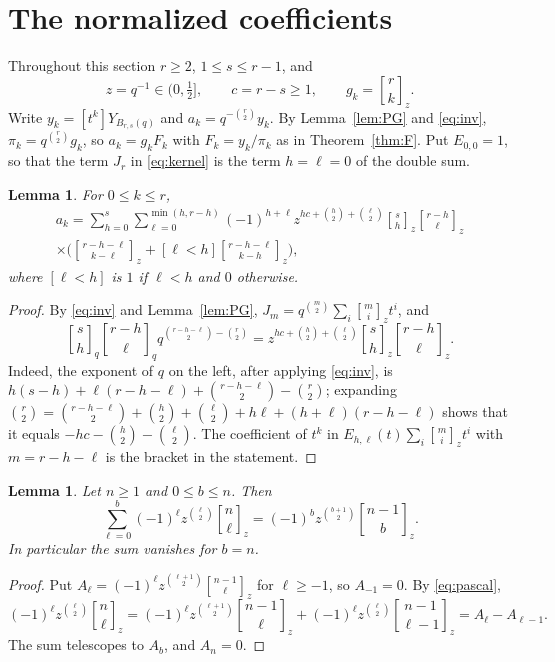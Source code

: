 \documentclass{amsart}
\newtheorem{lemma}[theorem]{Lemma}
\theoremstyle{remark}
\numberwithin{equation}{section}
\newcommand{\qbinom}[3]{\genfrac{[}{]}{0pt}{}{#1}{#2}_{#3}}
\begin{document}
\section{The normalized coefficients}\label{sec:expansion}

Throughout this section $r\ge2$, $1\le s\le r-1$, and
\[
  z=q^{-1}\in(0,\tfrac12],\qquad c=r-s\ge1,\qquad g_k=\qbinom{r}{k}{z}.
\]
Write $y_k=[t^k]Y_{B_{r,s}(q)}$ and $a_k=q^{-\binom r2}y_k$. By Lemma~\ref{lem:PG} and \eqref{eq:inv}, $\pi_k=q^{\binom r2}g_k$, so $a_k=g_kF_k$ with $F_k=y_k/\pi_k$ as in Theorem~\ref{thm:F}. Put $E_{0,0}=1$, so that the term $J_r$ in \eqref{eq:kernel} is the term $h=\ell=0$ of the double sum.

\begin{lemma}\label{lem:zform}
For $0\le k\le r$,
\begin{multline*}
  a_k=\sum_{h=0}^{s}\sum_{\ell=0}^{\min(h,r-h)}(-1)^{h+\ell}z^{hc+\binom h2+\binom\ell2}\qbinom{s}{h}{z}\qbinom{r-h}{\ell}{z}\\
  \times\biggl(\qbinom{r-h-\ell}{k-\ell}{z}+[\ell<h]\qbinom{r-h-\ell}{k-h}{z}\biggr),
\end{multline*}
where $[\ell<h]$ is $1$ if $\ell<h$ and $0$ otherwise.
\end{lemma}

\begin{proof}
By \eqref{eq:inv} and Lemma~\ref{lem:PG}, $J_m=q^{\binom m2}\sum_i\qbinom{m}{i}{z}t^i$, and
\[
  \qbinom{s}{h}{q}\qbinom{r-h}{\ell}{q}q^{\binom{r-h-\ell}{2}-\binom r2}
  =z^{hc+\binom h2+\binom\ell2}\qbinom{s}{h}{z}\qbinom{r-h}{\ell}{z}.
\]
Indeed, the exponent of $q$ on the left, after applying \eqref{eq:inv}, is $h(s-h)+\ell(r-h-\ell)+\binom{r-h-\ell}2-\binom r2$; expanding $\binom r2=\binom{r-h-\ell}2+\binom h2+\binom\ell2+h\ell+(h+\ell)(r-h-\ell)$ shows that it equals $-hc-\binom h2-\binom\ell2$. The coefficient of $t^k$ in $E_{h,\ell}(t)\sum_i\qbinom{m}{i}{z}t^i$ with $m=r-h-\ell$ is the bracket in the statement.
\end{proof}

\begin{lemma}\label{lem:partial}
Let $n\ge1$ and $0\le b\le n$. Then
\[
  \sum_{\ell=0}^{b}(-1)^\ell z^{\binom\ell2}\qbinom{n}{\ell}{z}=(-1)^bz^{\binom{b+1}2}\qbinom{n-1}{b}{z}.
\]
In particular the sum vanishes for $b=n$.
\end{lemma}

\begin{proof}
Put $A_\ell=(-1)^\ell z^{\binom{\ell+1}2}\qbinom{n-1}{\ell}{z}$ for $\ell\ge-1$, so $A_{-1}=0$. By \eqref{eq:pascal},
\[
  (-1)^\ell z^{\binom\ell2}\qbinom{n}{\ell}{z}=(-1)^\ell z^{\binom{\ell+1}2}\qbinom{n-1}{\ell}{z}+(-1)^\ell z^{\binom\ell2}\qbinom{n-1}{\ell-1}{z}=A_\ell-A_{\ell-1}.
\]
The sum telescopes to $A_b$, and $A_n=0$.
\end{proof}
\end{document}
